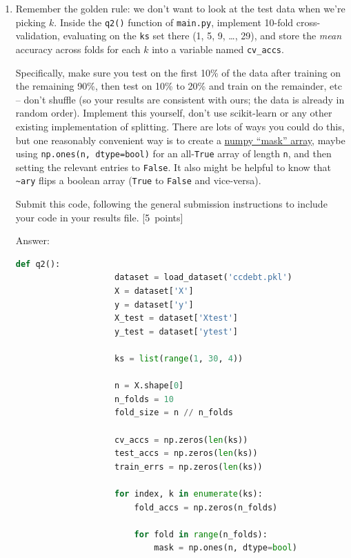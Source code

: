 \documentclass{article}
\newcommand{\blu}[1]{{\textcolor{blu}{#1}}}
\newenvironment{answer}{\par\begingroup\color{gre}Answer: }{\endgroup}
\let\ask\blu
\newcommand\pts[1]{\textcolor{pointscolour}{[#1~points]}}
\begin{document}
    \begin{enumerate}
        \item Remember the golden rule: we don't want to look at the test data when we're picking $k$. Inside the \texttt{q2()} function of \texttt{main.py}, implement 10-fold cross-validation, evaluating on the \texttt{ks} set there (1, 5, 9, \dots, 29), and store the \emph{mean} accuracy across folds for each $k$ into a variable named \texttt{cv\_accs}.

        Specifically, make sure you test on the first 10\% of the data after training on the remaining 90\%, then test on 10\% to 20\% and train on the remainder, etc -- don't shuffle (so your results are consistent with ours; the data is already in random order). Implement this yourself, don't use scikit-learn or any other existing implementation of splitting. There are lots of ways you could do this, but one reasonably convenient way is to create a \href{https://numpy.org/doc/stable/user/basics.indexing.html#boolean-or-mask-index-arrays}{numpy ``mask'' array}, maybe using \texttt{np.ones(n, dtype=bool)} for an all-\texttt{True} array of length \texttt{n}, and then setting the relevant entries to \texttt{False}. It also might be helpful to know that \texttt{\textasciitilde ary} flips a boolean array (\texttt{True} to \texttt{False} and vice-versa).

        \ask{Submit this code}, following the general submission instructions to include your code in your results file. \pts{5}

        \begin{answer}
            \begin{lstlisting}[language=Python]
                def q2():
                    dataset = load_dataset('ccdebt.pkl')
                    X = dataset['X']
                    y = dataset['y']
                    X_test = dataset['Xtest']
                    y_test = dataset['ytest']

                    ks = list(range(1, 30, 4))

                    n = X.shape[0]
                    n_folds = 10
                    fold_size = n // n_folds

                    cv_accs = np.zeros(len(ks))
                    test_accs = np.zeros(len(ks))
                    train_errs = np.zeros(len(ks))

                    for index, k in enumerate(ks):
                        fold_accs = np.zeros(n_folds)

                        for fold in range(n_folds):
                            mask = np.ones(n, dtype=bool)


\end{lstlisting}
\end{answer}
\end{enumerate}
\end{document}
